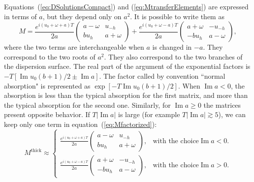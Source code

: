 \documentclass[preprint]{iucr}              %
\newcommand{\inblue}[1]{{\color{blue}#1}}
\begin{document}
Equations~(\ref{eq:DSolutionsCompact}) and (\ref{eq:MtransferElements}) are expressed in terms of $a$, but they depend only on $a^2$.
It is possible to write them as 
\begin{equation}\label{eq:Mfactorized}
    M =
    \frac{e^{i(u_0+\omega+a)T}}{2a}
    \begin{pmatrix}
    a-\omega & u_{-h}\\
    b u_h & a + \omega
    \end{pmatrix}
    + 
    \frac{e^{i(u_0+\omega-a)T}}{2a}
    \begin{pmatrix}
    a+\omega & -u_{-h}\\
    -b u_h & a - \omega
    \end{pmatrix}, 
\end{equation}
where the two terms are interchangeable when $a$ is changed in $-a$. They correspond to the two roots of $a^2$.
\inblue{They also correspond to the two branches of the dispersion surface}. The real part of the argument of the exponential factors is $-T [\operatorname{Im} u_0 (b+1)/2  \pm \operatorname{Im} a]$.
The factor called by convention ``normal absorption" is represented as $\exp[-T \operatorname{Im} u_0 (b+1)/2 ]$.
When $\operatorname{Im}a<0$,
the absorption is less than the typical absorption for the first matrix, and more than the typical absorption for the second one. Similarly, for  $\operatorname{Im}a \ge 0$ the matrices present opposite behavior.  If $T |\operatorname{Im}a|$ is large (for example $T |\operatorname{Im}a|  \gtrsim 5$), we can keep only one term in equation~(\ref{eq:Mfactorized}):
\begin{equation}\label{eq:Mthickapprox}
    M^{\text{thick}} \approx \begin{cases} 
    \frac{e^{i(u_0+\omega+a)T}}{2a}
    \begin{pmatrix}
    a-\omega & u_{-h}\\
    b u_h & a + \omega
    \end{pmatrix}, & \text{with the choice} \operatorname{Im}a<0.\\
    
    \frac{e^{i(u_0+\omega-a)T}}{2a}
    \begin{pmatrix}
    a+\omega & -u_{-h}\\
    -b u_h & a - \omega
    \end{pmatrix}, & \text{with the choice} \operatorname{Im}a>0.
    \end{cases}
\end{equation} 
\end{document}
